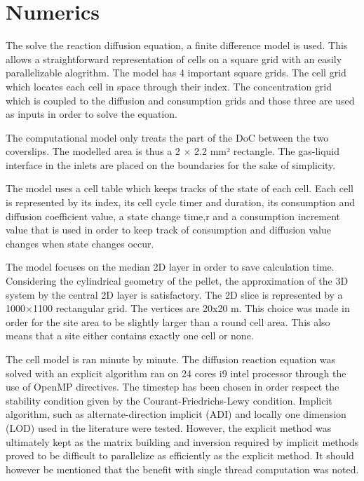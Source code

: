 \documentclass[11pt,a4paper]{article}
\begin{document}
\section{Numerics}
The solve the reaction diffusion equation, a finite difference model is used. This allows a straightforward representation of cells on a square grid with an easily parallelizable alogrithm. The model has 4 important square grids. The cell grid which locates each cell in space through their index. The concentration grid which is coupled to the diffusion and consumption grids and those three are used as inputs in order to solve the equation.

The computational model only treats the part of the DoC between the two coverslips. The modelled area is thus a 2 $\times$ 2.2 mm² rectangle. The gas-liquid interface in the inlets are placed on the boundaries for the sake of simplicity. 

The model uses a cell table which keeps tracks of the state of each cell. Each cell is represented by its index, its cell cycle timer and duration, its consumption and  diffusion coefficient value, a state change time,r and a consumption increment value that is used in order to keep track of consumption and diffusion value changes when state changes occur.

The model focuses on the median 2D layer in order to save calculation time. Considering the cylindrical geometry of the pellet, the approximation of the 3D system by the central 2D layer is satisfactory. The 2D slice is represented by a 1000$\times$1100 rectangular grid. The vertices are 20x20 \textmu m. This choice was made in order for the site area to be slightly larger than a round cell area. This also means that a site either contains exactly one cell or none.

The cell model is ran minute by minute. The diffusion reaction equation was solved with an explicit algorithm ran on 24 cores i9 intel processor through the use of OpenMP directives. The timestep has been chosen in order respect the stability condition given by the Courant-Friedrichs-Lewy condition. Implicit algorithm, such as alternate-direction implicit (ADI) and locally one dimension (LOD) used in the literature were tested.\cite{Kempf2005}\cite{Ghaffarizadeh2015}\cite{Ghaffarizadeh2017}\cite{Mao2018} However, the explicit method was ultimately kept as the matrix building and inversion required by implicit methods proved to be difficult to parallelize as efficiently as the explicit method. It should however be mentioned that the benefit with single thread computation was noted.
\end{document}
